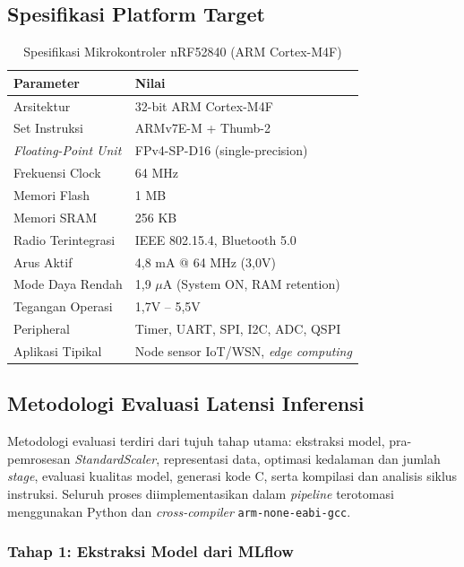 \subsection{Spesifikasi Platform Target}

\begin{table}[htbp]
\centering
\caption{Spesifikasi Mikrokontroler nRF52840 (ARM Cortex-M4F)}
\label{tab:nrf52840_specs}
\begin{tabular}{ll}
\hline
\textbf{Parameter} & \textbf{Nilai} \\
\hline
Arsitektur & 32-bit ARM Cortex-M4F \\
Set Instruksi & ARMv7E-M + Thumb-2 \\
\textit{Floating-Point Unit} & FPv4-SP-D16 (single-precision) \\
Frekuensi Clock & 64 MHz \\
Memori Flash & 1 MB \\
Memori SRAM & 256 KB \\
Radio Terintegrasi & IEEE 802.15.4, Bluetooth 5.0 \\
Arus Aktif & 4,8 mA @ 64 MHz (3,0V) \\
Mode Daya Rendah & 1,9 $\mu$A (System ON, RAM retention) \\
Tegangan Operasi & 1,7V -- 5,5V \\
Peripheral & Timer, UART, SPI, I2C, ADC, QSPI \\
Aplikasi Tipikal & Node sensor IoT/WSN, \textit{edge computing} \\
\hline
\end{tabular}
\end{table}

\subsection{Metodologi Evaluasi Latensi Inferensi}

Metodologi evaluasi terdiri dari tujuh tahap utama: ekstraksi model, pra-pemrosesan \textit{StandardScaler}, representasi data, optimasi kedalaman dan jumlah \textit{stage}, evaluasi kualitas model, generasi kode C, serta kompilasi dan analisis siklus instruksi. Seluruh proses diimplementasikan dalam \textit{pipeline} terotomasi menggunakan Python dan \textit{cross-compiler} \texttt{arm-none-eabi-gcc}.

\subsubsection{Tahap 1: Ekstraksi Model dari MLflow}

